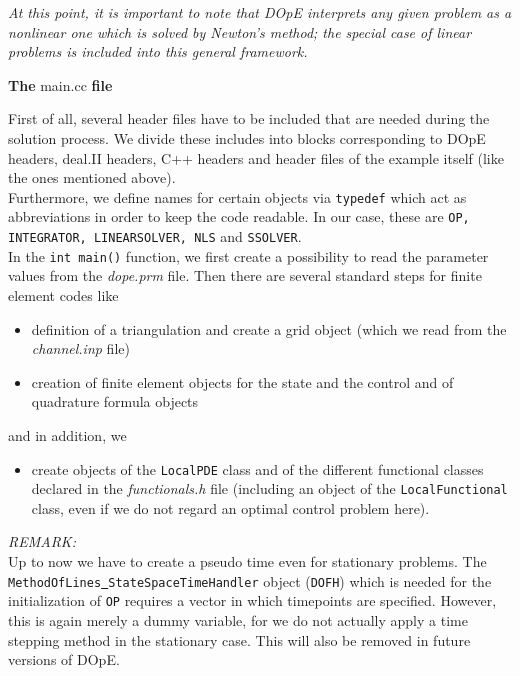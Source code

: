 \vspace{0.1cm}

\textit{At this point, it is important to note that DOpE interprets any given problem as a nonlinear one which is solved by Newton's method; the special case of linear problems is included into this general framework.}\\

\vspace{0.2cm}

\textbf{The} main.cc \textbf{file}\\

\vspace{0.2cm}

First of all, several header files have to be included that are needed during the solution process. We divide these includes into blocks corresponding to DOpE headers, deal.II headers, C++ headers and header files of the example itself (like the ones mentioned above).\\
Furthermore, we define names for certain objects via \texttt{typedef} which act as abbreviations in order to keep the code readable. In our case, these are \texttt{OP, INTEGRATOR, LINEARSOLVER, NLS} and \texttt{SSOLVER}.\\
In the \texttt{int main()} function, we first create a possibility to read the parameter values from the \textit{dope.prm} file. Then there are several standard steps for finite element codes like
\begin{itemize}
\item
definition of a triangulation and create a grid object (which we read from the \textit{channel.inp} file)
\item
creation of finite element objects for the state and the control and of quadrature formula objects
\end{itemize}
and in addition, we 
\begin{itemize}
\item
create objects of the \texttt{LocalPDE} class and of the different functional classes declared in the \textit{functionals.h} file (including an object of the \texttt{LocalFunctional} class, even if we do not regard an optimal control problem here).
\end{itemize}
\textit{REMARK:}\\
Up to now  we have to create a pseudo time even for stationary problems. The \\\texttt{MethodOfLines\underline{ }StateSpaceTimeHandler} object (\texttt{DOFH}) which is needed for the initialization of \texttt{OP} requires a vector in which timepoints are specified. However, this is again merely a dummy variable, for we do not actually apply a time stepping method in the stationary case. This will also be removed in future versions of DOpE.\\

